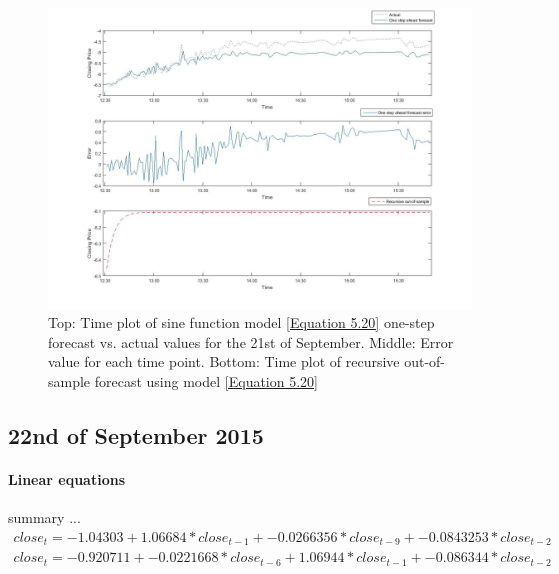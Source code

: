 \documentclass[13pt]{report}
\begin{document}
\begin{figure}[H]
\centering
\label{VWNonlinear21fig}
\includegraphics[width=\textwidth]{21nonlinear}
\caption{Top: Time plot of sine function model \ref{Equation 5.20} one-step forecast vs. actual values for the 21st of September. Middle: Error value for each time point. Bottom: Time plot of recursive out-of-sample forecast using model \ref{Equation 5.20}}
\end{figure}


\subsection{22nd of September 2015}
\paragraph{Linear equations}\hfill \break
summary ...
\begin{equation}
\begin{align*}
close_{t} = -1.04303 + 1.06684 * close_{t-1} + -0.0266356 * close_{t-9} + -0.0843253 * close_{t-2}
\end{align*}
\label{Equation 5.21}
\end{equation}
\begin{equation}
\begin{align*}
close_{t} = -0.920711 + -0.0221668 * close_{t-6} + 1.06944 * close_{t-1} + -0.086344 * close_{t-2}
\end{align*}
\label{Equation 5.22}
\end{equation}
\end{document}

